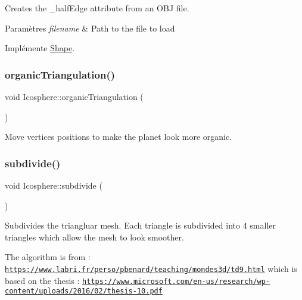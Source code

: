 Creates the \+\_\+half\+Edge attribute from an O\+BJ file. 


\begin{DoxyParams}{Paramètres}
{\em filename} & Path to the file to load \\
\hline
\end{DoxyParams}


Implémente \hyperlink{class_shape_a20d654ec232b682c36cd8b28d2cba750}{Shape}.

\mbox{\label{class_icosphere_ab3470de718fee359ef4691e0c2ee987a}} 
\subsubsection{\texorpdfstring{organic\+Triangulation()}{organicTriangulation()}}
{\footnotesize\ttfamily void Icosphere\+::organic\+Triangulation (\begin{DoxyParamCaption}{ }\end{DoxyParamCaption})}



Move vertices positions to make the planet look more organic. 

\mbox{\label{class_icosphere_a1086e13d1300ed79bf201d2570eb7ebe}} 
\subsubsection{\texorpdfstring{subdivide()}{subdivide()}}
{\footnotesize\ttfamily void Icosphere\+::subdivide (\begin{DoxyParamCaption}{ }\end{DoxyParamCaption})\hspace{0.3cm}{\ttfamily [private]}}



Subdivides the triangluar mesh. Each triangle is subdivided into 4 smaller triangles which allow the mesh to look smoother. 

The algorithm is from \+: \href{https://www.labri.fr/perso/pbenard/teaching/mondes3d/td9.html}{\tt https\+://www.\+labri.\+fr/perso/pbenard/teaching/mondes3d/td9.\+html} which is based on the thesis \+: \href{https://www.microsoft.com/en-us/research/wp-content/uploads/2016/02/thesis-10.pdf}{\tt https\+://www.\+microsoft.\+com/en-\/us/research/wp-\/content/uploads/2016/02/thesis-\/10.\+pdf}

